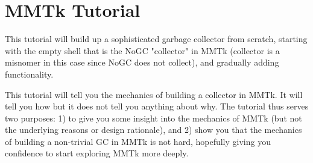 \documentclass[a4paper]{book}
\begin{document}

















































\chapter{MMTk Tutorial}
\label{cha:mmtktutorial}


This tutorial will build up a sophisticated garbage collector from scratch, starting with the empty shell that is the NoGC "collector" in MMTk (collector is a misnomer in this case since NoGC does not collect), and gradually adding functionality.

This tutorial will tell you the mechanics of building a collector in MMTk. It will tell you how but it does not tell you anything about why. The tutorial thus serves two purposes: 1) to give you some insight into the mechanics of MMTk (but not the underlying reasons or design rationale), and 2) show you that the mechanics of building a non-trivial GC in MMTk is not hard, hopefully giving you confidence to start exploring MMTk more deeply.
\end{document}
